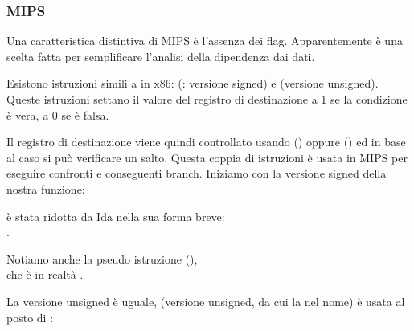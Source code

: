 \subsubsection{MIPS}

Una caratteristica distintiva di MIPS è l'assenza dei flag.
Apparentemente è una scelta fatta per semplificare l'analisi della dipendenza dai dati.


Esistono istruzioni simili a  in x86:  (: versione signed) e 
 (versione unsigned).
Queste istruzioni settano il valore del registro di destinazione a 1 se la condizione è vera, a 0 se è falsa.


Il registro di destinazione viene quindi controllato usando  () oppure  () 
ed in base al caso si può verificare un salto.
Questa coppia di istruzioni è usata in MIPS per eseguire confronti e conseguenti branch.
Iniziamo con la versione signed della nostra funzione:



 è stata ridotta da Ida nella sua forma breve:\\
.

Notiamo anche la pseudo istruzione  (),\\
che è in realtà .


La versione unsigned è uguale,  (versione unsigned, da cui la  nel nome) è usata al posto di :



